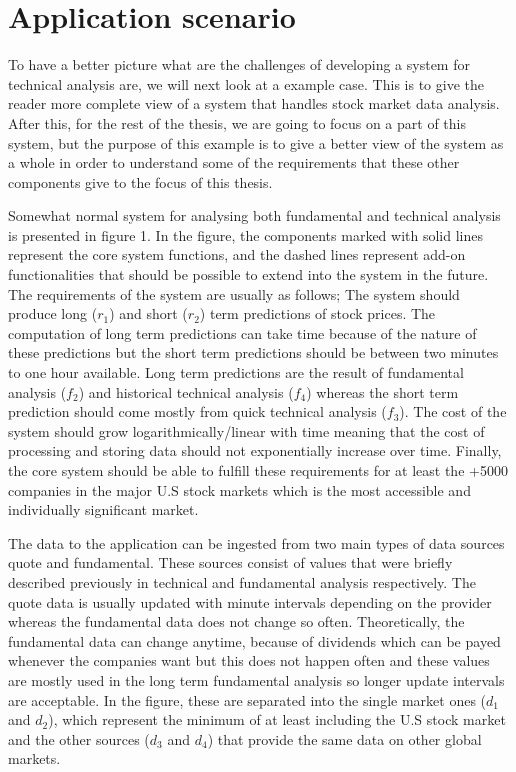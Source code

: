\section{Application scenario}

To have a better picture what are the challenges of developing a system for technical analysis are, we will next look at a example case.
This is to give the reader more complete view of a system that handles stock market data analysis.
After this, for the rest of the thesis, we are going to focus on a part of this system, but the purpose of this example is to give a better view of the system as a whole in order to understand some of the requirements that these other components give to the focus of this thesis.

Somewhat normal system for analysing both fundamental and technical analysis is presented in figure 1.
In the figure, the components marked with solid lines represent the core system functions, and the dashed lines represent add-on functionalities that should be possible to extend into the system in the future.
The requirements of the system are usually as follows;
The system should produce long ($r_1$) and short ($r_2$) term predictions of stock prices.
The computation of long term predictions can take time because of the nature of these predictions but the short term predictions should be between two minutes to one hour available.
Long term predictions are the result of fundamental analysis ($f_2$) and historical technical analysis ($f_4$) whereas the short term prediction should come mostly from quick technical analysis ($f_3$).
The cost of the system should grow logarithmically/linear with time meaning that the cost of processing and storing data should not exponentially increase over time.
Finally, the core system should be able to fulfill these requirements for at least the +5000 companies in the major U.S stock markets which is the most accessible and individually significant market.

The data to the application can be ingested from two main types of data sources quote and fundamental.
These sources consist of values that were briefly described previously in technical and fundamental analysis respectively.
The quote data is usually updated with minute intervals depending on the provider whereas the fundamental data does not change so often.
Theoretically, the fundamental data can change anytime, because of dividends which can be payed whenever the companies want but this does not happen often and these values are mostly used in the long term fundamental analysis so longer update intervals are acceptable.
In the figure, these are separated into the single market ones ($d_1$ and $d_2$), which represent the minimum of at least including the U.S stock market and the other sources ($d_3$ and $d_4$) that provide the same data on other global markets.

